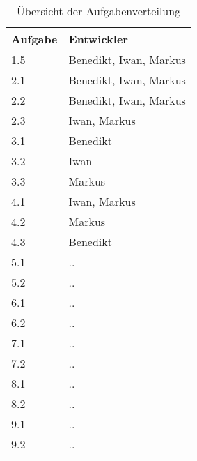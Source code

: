 \vspace{1em}
\begin{table}[!h]
    \centering
    \begin{tabular}{|l|l|}
        \hline
        \textbf{Aufgabe} & \textbf{Entwickler} \\
        \hline
        1.5 & Benedikt, Iwan, Markus \\
        \hline
        2.1 & Benedikt, Iwan, Markus \\
        \hline
        2.2 & Benedikt, Iwan, Markus \\
        \hline
        2.3 & Iwan, Markus \\
        \hline
        3.1 & Benedikt \\
        \hline
        3.2 & Iwan \\
        \hline
        3.3 & Markus \\
        \hline
        4.1 & Iwan, Markus \\
        \hline
        4.2 & Markus \\
        \hline
        4.3 & Benedikt \\
        \hline
        5.1 & .. \\
        \hline
        5.2 & .. \\
        \hline
        6.1 & .. \\
        \hline
        6.2 & .. \\
        \hline
        7.1 & .. \\
        \hline
        7.2 & .. \\
        \hline
        8.1 & .. \\
        \hline
        8.2 & .. \\
        \hline
        9.1 & .. \\
        \hline
        9.2 & .. \\
        \hline
    \end{tabular}
    \caption{Übersicht der Aufgabenverteilung}
    \label{tab:arbeitsverteilung}
\end{table}

\newpage

